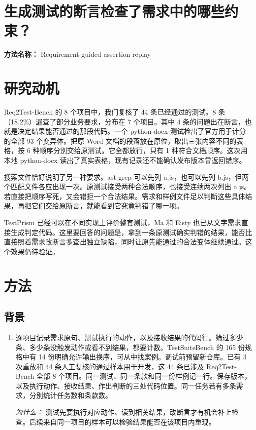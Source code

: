 \documentclass[10pt,a4paper]{article}
\begin{document}
\section*{生成测试的断言检查了需求中的哪些约束？}
\textbf{方法名称：} Requirement-guided assertion replay
\section*{研究动机}
Req2Test-Bench 的 8 个项目中，我们复核了 44 条已经通过的测试。8 条（18.2\%）漏查了部分业务要求，分布在 7 个项目。其中 4 条的问题出在断言，也就是决定结果能否通过的那段代码。一个 python-docx 测试检出了官方用于计分的全部 93 个变异体。把原 Word 文档的段落放在原位，取出三张内容不同的表格，按 6 种顺序分别交给原测试。它全都放行，只有 1 种符合文档顺序。这次用本地 python-docx 读出了真实表格，现有记录还不能确认发布版本曾返回错序。

搜索文件恰好说明了另一种要求。ast-grep 可以先列 a.js，也可以先列 b.js，但两个匹配文件各应出现一次。原测试接受两种合法顺序，也接受连续两次列出 a.js。若直接把顺序写死，又会错拒一个合法结果。需求和样例文件足以判断这些具体结果，再把它们交给原断言，就能看到它究竟判错了哪一项。

TestPrism 已经可以在不同实现上评价整套测试，Ma 和 Eisty 也已从文字需求直接生成判定代码。这里要回答的问题是，拿到一条原测试确实判错的结果，能否比直接照着需求改断言多查出独立缺陷，同时让原先能通过的合法变体继续通过。这个效果仍待验证。
\section*{方法}
\subsection*{背景}
\begin{enumerate}[leftmargin=*,start=1]
  \item 逐项目记录需求原句、测试执行的动作，以及接收结果的代码行。筛过多少条、多少条没触发动作或看不到结果，都要计数。TestSuiteBench 的 165 份规格中有 14 份明确允许输出换序，可从中找案例。调试前预留新仓库。已有 3 次重放和 44 条人工复核的通过样本用于开发，这 44 条已涉及 Req2Test-Bench 全部 8 个项目。同一测试、同一条款和同一份样例记一行。保存版本，以及执行动作、接收结果、作出判断的三处代码位置。同一任务若有多条需求，分别统计任务数和条款数。
\par\emph{为什么：} 测试先要执行对应动作、读到相关结果，改断言才有机会补上检查。后续来自同一项目的样本可以检验结果能否在该项目内重现。
\end{enumerate}
\end{document}
